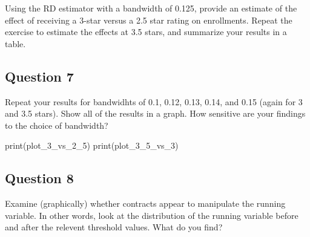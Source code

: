 \documentclass[
]{article}
\newenvironment{Shaded}{\begin{snugshade}}{\end{snugshade}}
\newcommand{\AttributeTok}[1]{\textcolor[rgb]{0.40,0.45,0.13}{#1}}
\newcommand{\DecValTok}[1]{\textcolor[rgb]{0.68,0.00,0.00}{#1}}
\newcommand{\FloatTok}[1]{\textcolor[rgb]{0.68,0.00,0.00}{#1}}
\newcommand{\FunctionTok}[1]{\textcolor[rgb]{0.28,0.35,0.67}{#1}}
\newcommand{\NormalTok}[1]{\textcolor[rgb]{0.00,0.23,0.31}{#1}}
\newcommand{\OtherTok}[1]{\textcolor[rgb]{0.00,0.23,0.31}{#1}}
\newcommand{\SpecialCharTok}[1]{\textcolor[rgb]{0.37,0.37,0.37}{#1}}
\begin{document}
Using the RD estimator with a bandwidth of 0.125, provide an estimate of
the effect of receiving a 3-star versus a 2.5 star rating on
enrollments. Repeat the exercise to estimate the effects at 3.5 stars,
and summarize your results in a table.

\begin{Shaded}
\end{Shaded}

\subsection{Question 7}\label{question-7}

Repeat your results for bandwidhts of 0.1, 0.12, 0.13, 0.14, and 0.15
(again for 3 and 3.5 stars). Show all of the results in a graph. How
sensitive are your findings to the choice of bandwidth?

\begin{Shaded}
\begin{Highlighting}[]
\FunctionTok{print}\NormalTok{(plot\_3\_vs\_2\_5)}
\FunctionTok{print}\NormalTok{(plot\_3\_5\_vs\_3)}
\end{Highlighting}
\end{Shaded}

\subsection{Question 8}\label{question-8}

Examine (graphically) whether contracts appear to manipulate the running
variable. In other words, look at the distribution of the running
variable before and after the relevent threshold values. What do you
find?
\end{document}
